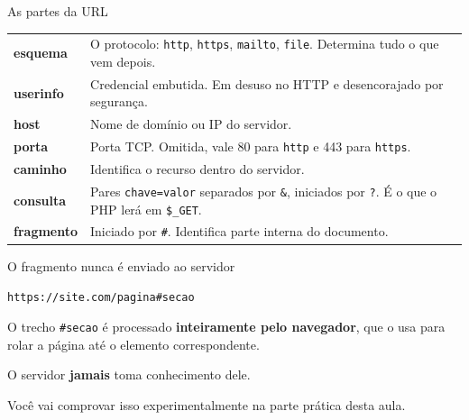 \documentclass{beamer}
\begin{document}
\begin{frame}{As partes da URL}
  \begin{center}
    \footnotesize
    \begin{tabular}{@{}lp{7.2cm}@{}}
      \toprule
      \textbf{esquema}  & O protocolo: \texttt{http}, \texttt{https}, \texttt{mailto}, \texttt{file}. Determina tudo o que vem depois. \\
      \textbf{userinfo} & Credencial embutida. Em desuso no HTTP e desencorajado por segurança. \\
      \textbf{host}     & Nome de domínio ou IP do servidor. \\
      \textbf{porta}    & Porta TCP. Omitida, vale 80 para \texttt{http} e 443 para \texttt{https}. \\
      \textbf{caminho}  & Identifica o recurso dentro do servidor. \\
      \textbf{consulta} & Pares \texttt{chave=valor} separados por \texttt{\&}, iniciados por \texttt{?}. É o que o PHP lerá em \texttt{\$\_GET}. \\
      \textbf{fragmento}& Iniciado por \texttt{\#}. Identifica parte interna do documento. \\
      \bottomrule
    \end{tabular}
  \end{center}
\end{frame}

\begin{frame}{O fragmento nunca é enviado ao servidor}
  \begin{center}
    \Large \texttt{https://site.com/pagina\#secao}
  \end{center}

  \vspace{0.6cm}
  O trecho \texttt{\#secao} é processado \textbf{inteiramente pelo navegador},
  que o usa para rolar a página até o elemento correspondente.

  \vspace{0.4cm}
  O servidor \textbf{jamais} toma conhecimento dele.

  \vspace{0.6cm}
  \begin{block}{}
    Você vai comprovar isso experimentalmente na parte prática desta aula.
  \end{block}
\end{frame}
\end{document}
